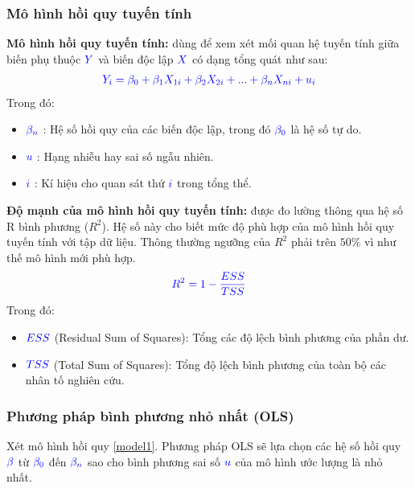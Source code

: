 \documentclass[a4paper]{article}
\begin{document}
	\subsubsection{Mô hình hồi quy tuyến tính}
    {\bfseries Mô hình hồi quy tuyến tính:} dùng để xem xét mối quan hệ tuyến tính giữa biến phụ thuộc $\textcolor{blue}{Y}$ và biến độc lập $\textcolor{blue}{X}$ có dạng tổng quát như sau:
    \begin{align}
        \textcolor{blue}{Y_{i} = \beta_{0} + \beta_{1} X_{1i} + \beta_{2} X_{2i} + ... + \beta_{n} X_{ni} + u_{i}}
        \label{model1}
    \end{align}
    Trong đó:
    \begin{itemize}
        \item $\textcolor{blue}{\beta_{n}}$ : Hệ số hồi quy của các biến độc lập, trong đó $\textcolor{blue}{\beta_{0}}$ là hệ số tự do.
        \item $\textcolor{blue}{u}$ : Hạng nhiễu hay sai số ngẫu nhiên.
        \item $\textcolor{blue}{i}$ : Kí hiệu cho quan sát thứ $\textcolor{blue}{i}$ trong tổng thể.
    \end{itemize}
    {\bfseries Độ mạnh của mô hình hồi quy tuyến tính:} được đo lường thông qua hệ số R bình phương ($R^{2}$). Hệ số này cho biết mức độ phù hợp của mô hình hồi quy tuyến tính với tập dữ liệu. Thông thường ngưỡng của $R^{2}$ phải trên $50\%$ vì như thế mô hình mới phù hợp.
    \begin{align*}
        \textcolor{blue}{R^{2} = 1 - \frac{ESS}{TSS}}
    \end{align*}
    Trong đó:
    \begin{itemize}
        \item $\textcolor{blue}{ESS}$ (Residual Sum of Squares): Tổng các độ lệch bình phương của phần dư.
        \item $\textcolor{blue}{TSS}$ (Total Sum of Squares): Tổng độ lệch bình phương của toàn bộ các nhân tố nghiên cứu.
    \end{itemize}

    \subsubsection{Phương pháp bình phương nhỏ nhất (OLS)}
    Xét mô hình hồi quy \eqref{model1}. Phương pháp OLS sẽ lựa chọn các hệ số hồi quy $\textcolor{blue}{\beta}$ từ $\textcolor{blue}{\beta_{0}}$ đến $\textcolor{blue}{\beta_{n}}$ sao cho bình phương sai số $\textcolor{blue}{u}$ của mô hình ước lượng là nhỏ nhất.
    
\end{document}
